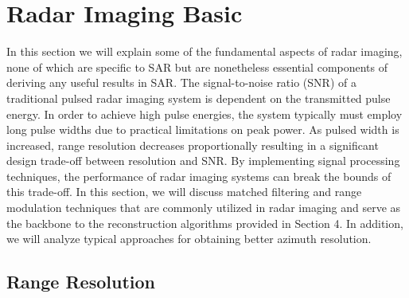 \documentclass{article}
\begin{document}
\section{Radar Imaging Basic}
\indent \indent
In this section we will explain some of the fundamental aspects of radar imaging, none of which are specific to SAR but are nonetheless essential components of deriving any useful results in SAR.  The signal-to-noise ratio (SNR) of a traditional pulsed radar imaging system is dependent on the transmitted pulse energy. In order to achieve high pulse energies, the system typically must employ long pulse widths due to practical limitations on peak power. As pulsed width is increased, range resolution decreases proportionally resulting in a significant design trade-off between resolution and SNR. By implementing signal processing techniques, the performance of radar imaging systems can break the bounds of this trade-off. In this section, we will discuss matched filtering and range modulation techniques that are commonly utilized in radar imaging and serve as the backbone to the reconstruction algorithms provided in Section 4. In addition, we will analyze typical approaches for obtaining better azimuth resolution.

\subsection{Range Resolution}
\end{document}
